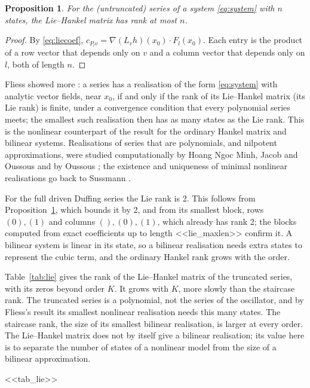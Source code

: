 \documentclass[11pt,a4paper]{article}
\newtheorem{proposition}{Proposition}
\theoremstyle{remark}
\begin{document}
\begin{proposition}\label{prop:lie}
For the (untruncated) series of a system \eqref{eq:system} with $n$ states, the Lie--Hankel matrix has rank at most $n$.
\end{proposition}
\begin{proof}
By \eqref{eq:liecoef}, $c_{P_lv}=\nabla(L_vh)(x_0)\cdot F_l(x_0)$.
Each entry is the product of a row vector that depends only on $v$ and a column vector that depends only on $l$, both of length $n$.
\end{proof}
Fliess showed more \cite{Fliess1983}: a series has a realisation of the form \eqref{eq:system} with analytic vector fields, near $x_0$, if and only if the rank of its Lie--Hankel matrix (its Lie rank) is finite, under a convergence condition that every polynomial series meets; the smallest such realisation then has as many states as the Lie rank.
This is the nonlinear counterpart of the result for the ordinary Hankel matrix and bilinear systems.
Realisations of series that are polynomials, and nilpotent approximations, were studied computationally by Hoang Ngoc Minh, Jacob and Oussous \cite{HoangJacobOussous1991} and by Oussous \cite{Oussous1991a,Oussous1991b}; the existence and uniqueness of minimal nonlinear realisations go back to Sussmann \cite{Sussmann1977}.

For the full driven Duffing series the Lie rank is 2.
This follows from Proposition~\ref{prop:lie}, which bounds it by 2, and from its smallest block, rows $(0),(1)$ and columns $(),(0),(1)$, which already has rank 2; the blocks computed from exact coefficients up to length <<lie_maxlen>> confirm it.
A bilinear system is linear in its state, so a bilinear realisation needs extra states to represent the cubic term, and the ordinary Hankel rank grows with the order.

Table~\ref{tab:lie} gives the rank of the Lie--Hankel matrix of the truncated series, with its zeros beyond order $K$.
It grows with $K$, more slowly than the staircase rank.
The truncated series is a polynomial, not the series of the oscillator, and by Fliess's result its smallest nonlinear realisation needs this many states.
The staircase rank, the size of its smallest bilinear realisation, is larger at every order.
The Lie--Hankel matrix does not by itself give a bilinear realisation; its value here is to separate the number of states of a nonlinear model from the size of a bilinear approximation.

\begin{table}[t]\centering\small
\caption{Rank of the Lie--Hankel matrix of the driven Duffing series truncated at order $K$ (rows: Lyndon words up to length $K$; columns: all words up to length $K$; entries beyond order $K$ zero), and the staircase rank, the minimal bilinear size, from Table~\ref{tab:dims}.}\label{tab:lie}
<<tab_lie>>
\end{table}
\end{document}
